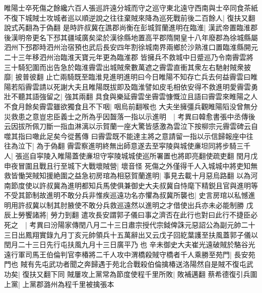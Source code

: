 睢陽士卒死傷之餘纔六百人張巡許遠分城而守之巡守東北遠守西南與士卒同食茶紙不復下城賊士攻城者巡以順逆說之往往棄賊來降為巡死戰前後二百餘人|{
	復扶又翻說式芮翻為于偽翻}
是時許叔冀在譙郡尚衡在彭城賀蘭進明在臨淮|{
	漢武帝置臨淮郡後漢明帝更名下邳其疆域廣矣梁於漢徐縣地置高平郡隋開皇十八年廢郡為徐城縣屬泗州下邳郡時泗州治宿預也武后長安四年割徐城南界兩鄉於沙熟淮口置臨淮縣開元二十三年移泗州治臨淮天寶元年更為臨淮郡}
皆擁兵不救城中日蹙巡乃令南霽雲將三十騎犯圍而出告急於臨淮霽雲出城賊衆數萬遮之霽雲直衝其衆左右馳射賊衆披靡|{
	披普彼翻}
止亡兩騎既至臨淮見進明進明曰今日睢陽不知存亡兵去何益霽雲曰睢陽若䧟霽雲請以死謝大夫且睢陽既拔即及臨淮譬如皮毛相依安得不救進明愛霽雲勇壯不聽其語強留之|{
	強其兩翻}
具食與樂延霽雲坐霽雲慷慨泣且語曰霽雲來睢陽之人不食月餘矣霽雲雖欲獨食且不下咽|{
	咽烏前翻喉也}
大夫坐擁彊兵觀睢陽䧟没曾無分災救患之意豈忠臣義士之所為乎因齧落一指以示進明　|{
	考異曰韓愈書張中丞傳後云因拔所佩刀斷一指血淋漓以示賀蘭一座大驚皆感激為雲泣下按柳宗元霽雲碑云自噬其指曰噉此足矣今從舊傳}
曰霽雲既不能達主將之意請留一指以示信歸報座中往往為泣下|{
	為于偽翻}
霽雲察進明終無出師意遂去至寜陵與城使亷坦同將步騎三千人|{
	張巡自寜陵入睢陽蓋使亷坦守寜陵城城使巡所署置也將即亮翻使疏吏翻}
閏月戊申夜冒圍且戰且行至城下大戰壞賊營|{
	壞音怪}
死傷之外僅得千人入城城中將吏知無救皆慟哭賊知援絶圍之益急初房琯為相惡賀蘭進明|{
	事見去載十月惡烏路翻}
以為河南節度使以許叔冀為進明都知兵馬使俱兼御史大夫叔冀自恃麾下精鋭且官與進明等不受其節制故進明不敢分兵非惟疾巡遠功名亦懼為叔冀所襲也|{
	史言房琯以私憾進明用許叔冀以制其肘腋使不敢分兵救巡遠然以進明之才借使出兵亦未必能制勝}
戊辰上勞饗諸將|{
	勞力到翻}
遣攻長安謂郭子儀曰事之濟否在此行也對曰此行不捷臣必死之　|{
	考異曰汾陽家傳閏八月二十三日肅宗授代宗鉞俾誅元惡詔公為副元帥二十三日出鳳翔實錄九月丁亥元帥領兵十五萬辭出又云戊子回紇葉護至扶風蓋郭子儀以閏月二十三日先行屯扶風九月十三日廣平乃也}
辛未御史大夫崔光遠破賊於駱谷光遠行軍司馬王伯倫判官李椿將二千人攻中渭橋殺賊守橋者千人乘勝至苑門|{
	長安苑門也}
賊有先屯武功者聞之奔歸遇于苑北合戰殺伯倫擒椿送洛陽然自是賊不復屯武功矣|{
	復扶又翻下同}
賊屢攻上黨常為節度使程千里所敗|{
	敗補邁翻}
蔡希德復引兵圍上黨|{
	上黨郡潞州為程千里被擒張本}


